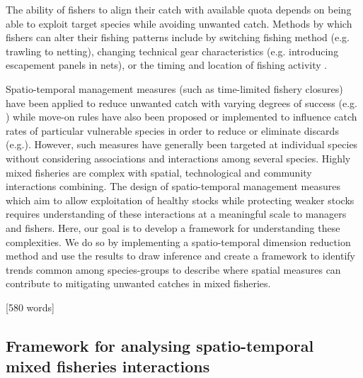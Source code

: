 \documentclass{nature}
\begin{document}
\begin{linenumbers}
The ability of fishers to align their catch with available quota depends on
being able to exploit target species while avoiding unwanted catch. Methods by
which fishers can alter their fishing patterns include by switching fishing
method (e.g. trawling to netting), changing technical gear characteristics
(e.g.  introducing escapement panels in nets), or the timing and location of
fishing activity \cite{Fulton2011b, vanPutten2012a}.

Spatio-temporal management measures (such as time-limited fishery closures)
have been applied to reduce unwanted catch with varying degrees of success
(e.g.  \cite{Needle2011, Holmes2011, Beare2010, Dinmore2003}) while move-on
rules have also been proposed or implemented to influence catch rates of
particular vulnerable species in order to reduce or eliminate discards
(e.g.\cite{Gardner2008, Dunn2011, Dunn2014a}). However, such measures have
generally been targeted at individual species without considering associations
and interactions among several species. Highly mixed fisheries are complex with
spatial, technological and community interactions combining. The design of
spatio-temporal management measures which aim to allow exploitation of healthy
stocks while protecting weaker stocks requires understanding of these
interactions at a meaningful scale to managers and fishers. Here, our goal is
to develop a framework for understanding these complexities. We do so by
implementing a spatio-temporal dimension reduction method and use the results
to draw inference and create a framework to identify trends common among
species-groups to describe where spatial measures can contribute to mitigating
unwanted catches in mixed fisheries.

[580 words]

\subsection{Framework for analysing spatio-temporal mixed fisheries
	interactions}


\end{linenumbers}
\end{document}

